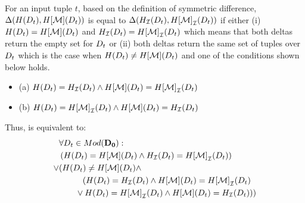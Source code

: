 For an input tuple $t$, based on the definition of symmetric difference, $\Delta(H(D_{t}),H[\mathcal{M}](D_{t}))$ is equal to $\Delta({H}_{\mathcal{I}}(D_{t}),{H[\mathcal{M}]}_{\mathcal{I}}(D_{t}))$ if either (i) $H(D_{t}) = H[\mathcal{M}](D_{t})$ and ${H}_{\mathcal{I}}(D_{t}) = {H[\mathcal{M}]}_{\mathcal{I}}(D_{t})$ which means that both deltas return the empty set for $D_{t}$ or (ii) both deltas return the same set of tuples over $D_{t}$ which is the case when $H(D_{t}) \neq H[\mathcal{M}](D_{t})$ and one of the conditions shown below holds.
\begin{itemize}
\item (a) $H(D_{t}) = {H}_{\mathcal{I}}(D_{t}) \land H[\mathcal{M}](D_{t}) =  {H[\mathcal{M}]}_{\mathcal{I}}(D_{t})$
\item (b)
$H(D_{t}) = {H[\mathcal{M}]}_{\mathcal{I}}(D_{t}) \land H[\mathcal{M}](D_{t}) = {H}_{\mathcal{I}}(D_{t})$
\end{itemize}
%
 Thus,  is equivalent to:
%
\begin{align}
  \label{eq:slice-test-cases}
  \begin{split}
    &\forall D_{t} \in Mod({\mathbf{D_0}}):\\
    &\left(H(D_{t}) = H[\mathcal{M}](D_{t}) \land {H}_{\mathcal{I}}(D_{t}) = {H[\mathcal{M}]}_{\mathcal{I}}(D_{t})\right)   \\
    \lor &(H(D_{t}) \neq H[\mathcal{M}](D_{t}) \land\\
    &\hspace{1cm}(
           H(D_{t}) = {H}_{\mathcal{I}}(D_{t}) \land H[\mathcal{M}](D_{t}) =  {H[\mathcal{M}]}_{\mathcal{I}}(D_{t})  \\
  &\hspace{0.7cm}\lor H(D_{t}) = {H[\mathcal{M}]}_{\mathcal{I}}(D_{t}) \land H[\mathcal{M}](D_{t}) = {H}_{\mathcal{I}}(D_{t})))
  \end{split}
\end{align}

